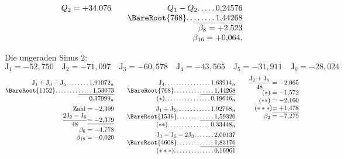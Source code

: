\begin{landscape}
\[\begin{array}{@{}r@{\qquad}r@{}}
Q_2=+34{,}076&Q_1-Q_2\VfourDots{4}0{,}24576\\
&\BareRoot{768}\VfourDots{1}\underline{\VfourDots{5}1{,}44268}\\
&\beta_8=+2{,}523\\
&\beta_{16}=+0{,}064.
\end{array}
\]
\par\noindent\hspace*{\parindent}Die ungeraden Sinus 2:
\[\mathrm{J}_1=-52{,}750\quad\mathrm{J}_2=-71{,}097\quad\mathrm{J}_3=-60{,}578\quad\mathrm{J}_4=-43{,}565\quad\mathrm{J}_5=-31{,}911\quad\mathrm{J}_6=-28{,}024\]
\[
\begin{array}{@{}r@{\qquad}r@{\qquad}r@{}}
\begin{array}[t]{@{}r@{}}
\mathrm{J}_1+\mathrm{J}_3-\mathrm{J}_5\VfourDots{7}1{,}91072_n\\
\BareRoot{1152}\VfourDots{7}\underline{\VfourDots{4}1{,}53073}\\
0{,}37999_n\\[4pt]
\text{Zahl}=-2{,}399\\
\dfrac{2\mathrm{J}_2-\mathrm{J}_6}{48}\underline{=-2{,}379}\\
\beta_6=-4{,}778\\
\beta_{18}=-0{,}020
\end{array}
&\begin{array}[t]{@{}r@{}}
\mathrm{J}_4\VfourDots{15}1{,}63914_n\\
\BareRoot{768}\VfourDots{8}\underline{\VfourDots{4}1{,}44268}\\
(*)\VfourDots{15}0{,}19646_n\\[4pt]
\mathrm{J}_1+\mathrm{J}_5\VfourDots{11}1{,}92768_n\\
\BareRoot{1536}\VfourDots{7}\underline{\VfourDots{4}1{,}59320}\\
(**)\VfourDots{14}0{,}33448_n\\[4pt]
\mathrm{J}_1-\mathrm{J}_5-2\mathrm{J}_3\VfourDots{6}2{,}00137\\
\BareRoot{4608}\VfourDots{7}\underline{\VfourDots{4}1{,}83176}\\
(***)\VfourDots{13}0{,}16961
\end{array}
&\begin{array}[t]{@{}r@{}}
\dfrac{\mathrm{J}_2+\mathrm{J}_6}{48}=-2{,}065\\
(*)=-1{,}572\\
(**)=-2{,}160\\
(***)\underline{=+1{,}478}\\
\beta_2=-7{,}275\\

\end{array}
\end{array}\]
\end{landscape}
